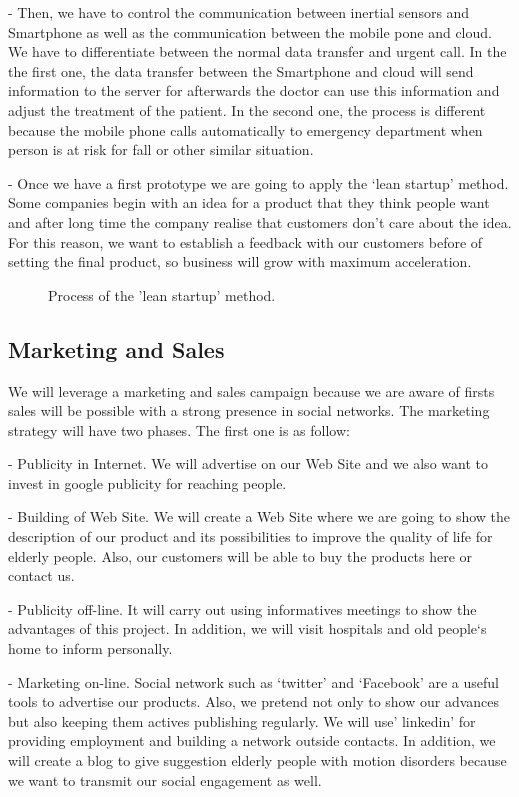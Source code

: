 -	Then, we have to control the communication between inertial sensors and Smartphone as well as the communication between the mobile pone and cloud. We have to differentiate between the normal data transfer and urgent call. In the the first one, the data transfer between the Smartphone and cloud will send information to the server for afterwards the doctor can use this information and adjust the treatment of the patient. In the second one, the process is different because the mobile phone calls automatically to emergency department when person is at risk for fall or other similar situation.

-	Once we have a first prototype we are going to apply the ‘lean startup’ method. Some companies begin with an idea for a product that they think people want and after long time the company realise that customers don’t care about the idea. For this reason, we want to establish a feedback with our customers before of setting the final product, so  business will grow with maximum acceleration.

\begin{figure}[H]
	\centering
	\caption{Process of the 'lean startup' method.}
	\label{fig:leanstartup_diagram}
\end{figure}

\subsection{Marketing and Sales}
We will leverage a marketing and sales campaign because we are aware of firsts sales will be possible with a strong presence in social networks. The marketing strategy will have two phases. The first one is as follow:

-	Publicity in Internet. We will advertise on our Web Site and we also want to invest in google publicity for reaching people.

-	Building of Web Site. We will create a Web Site where we are going to show the description of our product and its possibilities to improve the quality of life for elderly people. Also, our customers will be able to buy the products here or contact us.

-	Publicity off-line. It will carry out using informatives meetings to show the advantages of this project. In addition, we will visit hospitals and old people`s home to inform personally.

-	Marketing on-line. Social network such as ‘twitter’ and ‘Facebook’ are a useful tools to advertise our products. Also, we pretend not only to show our advances but also keeping them actives publishing regularly.
We will use’ linkedin’ for providing employment and building a network outside contacts.
In addition, we will create a blog to give suggestion elderly people with motion disorders because we want to transmit our social engagement as well.

